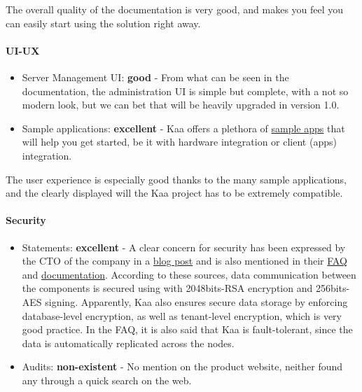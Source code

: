 \documentclass{article}
\begin{document}
The overall quality of the documentation is very good, and makes you feel you can easily start using the solution right away.

\paragraph{UI-UX}

\begin{itemize}
\item Server Management UI: \textbf{good} - From what can be seen in the documentation, the administration UI is simple but complete, with a not so modern look, but we can bet that will be heavily upgraded in version 1.0.
\item Sample applications: \textbf{excellent} - Kaa offers a plethora of \href{https://github.com/kaaproject/sample-apps}{sample apps} that will help you get started, be it with hardware integration or client (apps) integration.
\end{itemize}

The user experience is especially good thanks to the many sample applications, and the clearly displayed will the Kaa project has to be extremely compatible.

\paragraph{Security}

\begin{itemize}
\item Statements: \textbf{excellent} - A clear concern for security has been expressed by the CTO of the company in a \href{https://www.kaaproject.org/lets-address-dark-side-iot-tackling-security-community/}{blog post} and is also mentioned in their \href{https://www.kaaproject.org/faq/}{FAQ} and \href{http://docs.kaaproject.org/display/KAA/Endpoint+registration#Endpointregistration-Registrationsecurity}{documentation}. According to these sources, data communication between the components is secured using with 2048bits-RSA encryption and 256bits-AES signing. Apparently, Kaa also ensures secure data storage by enforcing database-level encryption, as well as tenant-level encryption, which is very good practice. In the FAQ, it is also said that Kaa is fault-tolerant, since the data is automatically replicated across the nodes.
\item Audits: \textbf{non-existent} - No mention on the product website, neither found any through a quick search on the web.
\end{itemize}
\end{document}
